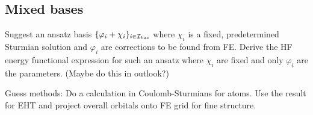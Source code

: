 
\subsection{Mixed bases}
Suggest an ansatz basis $\{\varphi_i + \chi_i\}_{i\in\mathcal{I}_\text{bas}}$
where $\chi_i$ is a fixed, predetermined Sturmian solution
and $\varphi_i$ are corrections to be found from FE.
Derive the HF energy functional expression for such an ansatz
where $\chi_i$ are fixed and only $\varphi_i$ are the parameters.
(Maybe do this in outlook?)




Guess methods:
Do a calculation in Coulomb-Sturmians for atoms.
Use the result for EHT and project overall orbitals onto FE grid
for fine structure.
